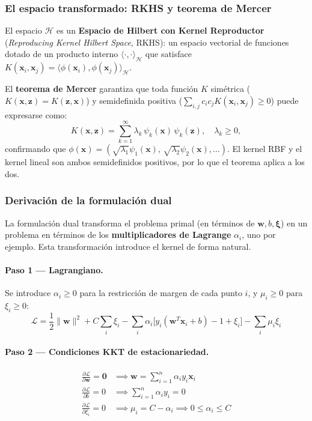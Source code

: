 \documentclass[spanish]{article}
\begin{document}
\subsubsection{El espacio transformado: RKHS y teorema de Mercer}

El espacio $\mathcal{H}$ es un \textbf{Espacio de Hilbert con Kernel Reproductor} (\textit{Reproducing Kernel Hilbert Space}, RKHS): un espacio vectorial de funciones dotado de un producto interno $\langle\cdot,\cdot\rangle_\mathcal{H}$ que satisface $K(\mathbf{x}_i, \mathbf{x}_j) = \langle\phi(\mathbf{x}_i), \phi(\mathbf{x}_j)\rangle_\mathcal{H}$.

El \textbf{teorema de Mercer} garantiza que toda función $K$ simétrica ($K(\mathbf{x},\mathbf{z}) = K(\mathbf{z},\mathbf{x})$) y semidefinida positiva ($\sum_{i,j} c_i c_j K(\mathbf{x}_i,\mathbf{x}_j) \geq 0$) puede expresarse como:
\begin{equation}
K(\mathbf{x}, \mathbf{z}) = \sum_{k=1}^{\infty} \lambda_k \, \psi_k(\mathbf{x})\, \psi_k(\mathbf{z}), \quad \lambda_k \geq 0,
\end{equation}
confirmando que $\phi(\mathbf{x}) = (\sqrt{\lambda_1}\psi_1(\mathbf{x}),\, \sqrt{\lambda_2}\psi_2(\mathbf{x}), \ldots)$. El kernel RBF y el kernel lineal son ambos semidefinidos positivos, por lo que el teorema aplica a los dos.

\subsubsection{Derivación de la formulación dual}

La formulación dual transforma el problema primal (en términos de $\mathbf{w}, b, \boldsymbol{\xi}$) en un problema en términos de los \textbf{multiplicadores de Lagrange} $\alpha_i$, uno por ejemplo. Esta transformación introduce el kernel de forma natural.

\paragraph{Paso 1 — Lagrangiano.} Se introduce $\alpha_i \geq 0$ para la restricción de margen de cada punto $i$, y $\mu_i \geq 0$ para $\xi_i \geq 0$:
\begin{equation}
\mathcal{L} = \frac{1}{2}\|\mathbf{w}\|^2 + C\sum_{i}\xi_i - \sum_{i}\alpha_i\bigl[y_i(\mathbf{w}^T\mathbf{x}_i + b) - 1 + \xi_i\bigr] - \sum_{i}\mu_i\xi_i
\end{equation}

\paragraph{Paso 2 — Condiciones KKT de estacionariedad.}
\begin{align}
\frac{\partial\mathcal{L}}{\partial\mathbf{w}} = \mathbf{0} &\implies \mathbf{w} = \sum_{i=1}^{n}\alpha_i y_i \mathbf{x}_i \label{eq:w} \\
\frac{\partial\mathcal{L}}{\partial b} = 0 &\implies \sum_{i=1}^{n}\alpha_i y_i = 0 \label{eq:b} \\
\frac{\partial\mathcal{L}}{\partial\xi_i} = 0 &\implies \mu_i = C - \alpha_i \implies 0 \leq \alpha_i \leq C \label{eq:xi}
\end{align}
\end{document}

